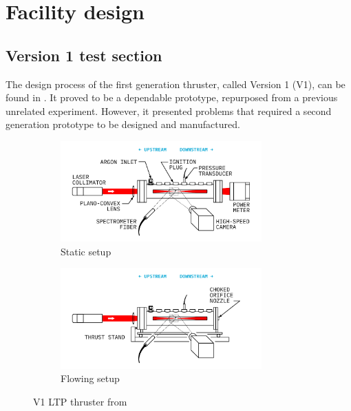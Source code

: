 \chapter{Facility design}

    \section{Version 1 test section} \label{sec:design_v1}

        The design process of the first generation thruster, called Version 1 (V1), can be found in \textcite{duplayArgonLaserPlasmaThruster2024a}. It proved to be a dependable prototype, repurposed from a previous unrelated experiment. However, it presented problems that required a second generation prototype to be designed and manufactured.

        \begin{figure}[!ht]
            \centering
            \begin{subfigure}[t]{\textwidth}
                \centering
                \includegraphics[width=0.85\textwidth]{assets/3 design/finalsetup_static.pdf}
                \caption{Static setup}
            \end{subfigure}
            \hfill
            \begin{subfigure}[t]{\textwidth}
                \centering
                \includegraphics[width=0.85\textwidth]{assets/3 design/finalsetup_flowing.pdf}
                \caption{Flowing setup}
            \end{subfigure}
            \caption{V1 LTP thruster from \textcite{duplayArgonLaserPlasmaThruster2024a}}
            \label{fig:V1 setup}
        \end{figure}

